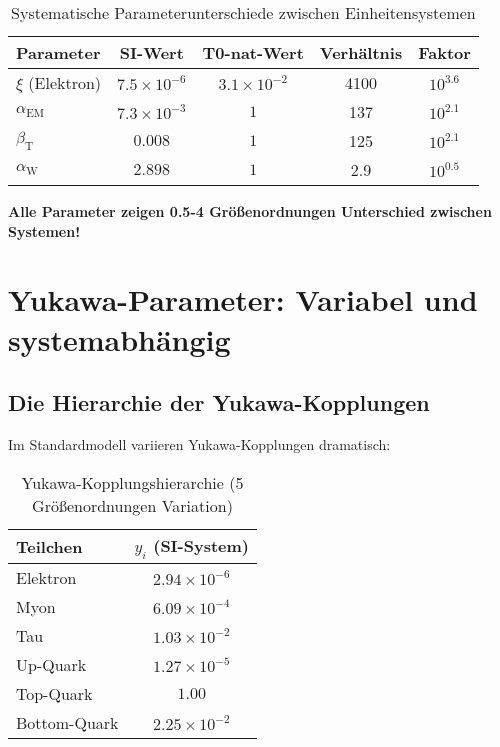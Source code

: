 \documentclass[12pt,a4paper]{article}
\newcommand{\xipar}{\xi}
\begin{document}
	\begin{table}[htbp]
		\centering
		\begin{tabular}{lcccc}
			\toprule
			\textbf{Parameter} & \textbf{SI-Wert} & \textbf{T0-nat-Wert} & \textbf{Verhältnis} & \textbf{Faktor} \\
			\midrule
			$\xipar$ (Elektron) & $7.5 \times 10^{-6}$ & $3.1 \times 10^{-2}$ & 4100 & $10^{3.6}$ \\
			$\alpha_{\text{EM}}$ & $7.3 \times 10^{-3}$ & $1$ & 137 & $10^{2.1}$ \\
			$\beta_{\text{T}}$ & $0.008$ & $1$ & 125 & $10^{2.1}$ \\
			$\alpha_{\text{W}}$ & $2.898$ & $1$ & 2.9 & $10^{0.5}$ \\
			\bottomrule
		\end{tabular}
		\caption{Systematische Parameterunterschiede zwischen Einheitensystemen}
		\label{tab:parameter_vergleich}
	\end{table}
	
	\textbf{Alle Parameter zeigen 0.5-4 Größenordnungen Unterschied zwischen Systemen!}
	
	\section{Yukawa-Parameter: Variabel und systemabhängig}
	\label{sec:yukawa_parameter}
	
	\subsection{Die Hierarchie der Yukawa-Kopplungen}
	\label{subsec:yukawa_hierarchie}
	
	Im Standardmodell variieren Yukawa-Kopplungen dramatisch:
	
	\begin{table}[htbp]
		\centering
		\begin{tabular}{lc}
			\toprule
			\textbf{Teilchen} & \textbf{$y_i$ (SI-System)} \\
			\midrule
			Elektron & $2.94 \times 10^{-6}$ \\
			Myon & $6.09 \times 10^{-4}$ \\
			Tau & $1.03 \times 10^{-2}$ \\
			Up-Quark & $1.27 \times 10^{-5}$ \\
			Top-Quark & $1.00$ \\
			Bottom-Quark & $2.25 \times 10^{-2}$ \\
			\bottomrule
		\end{tabular}
		\caption{Yukawa-Kopplungshierarchie (5 Größenordnungen Variation)}
		\label{tab:yukawa_hierarchie}
	\end{table}
	
\end{document}
